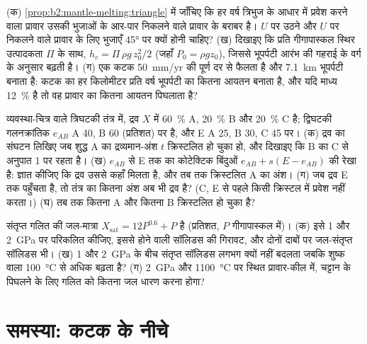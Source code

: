 \begin{exercise}[$\star\star\star$]\label{exo:b2:mantle-melting:10}
(क) \cref{prop:b2:mantle-melting:triangle} में जाँचिए कि हर वर्ष त्रिभुज के आधार में
प्रवेश करने वाला प्रावार उसकी भुजाओं के आर-पार निकलने वाले प्रावार के बराबर है। $U$ पर उठने और $U$ पर निकलने वाले
प्रावार के लिए भुजाएँ \ang{45} पर क्यों होनी चाहिए?
(ख) दिखाइए कि प्रति गीगापास्कल स्थिर उत्पादकता $\Pi$ के साथ, $h_c = \Pi\,\rho
g\,z_0^2/2$ (जहाँ $P_0 = \rho g z_0$), जिससे भूपर्पटी आरंभ की
गहराई के वर्ग के अनुसार बढ़ती है। (ग) एक कटक \qty{50}{mm/yr} की पूर्ण दर से फैलता है और
\qty{7.1}{km} भूपर्पटी बनाता है: कटक का हर किलोमीटर प्रति वर्ष भूपर्पटी का कितना आयतन
बनाता है, और यदि माध्य 
\qty{12}{\percent} है तो वह प्रावार का कितना आयतन पिघलाता है?
\end{exercise}

\begin{exercise}[$\star\star\star$]\label{exo:b2:mantle-melting:11}
व्यवस्था-चित्र वाले त्रिघटकी तंत्र में, द्रव $X$ में
\qty{60}{\percent} A, \qty{20}{\percent} B और \qty{20}{\percent} C है;
द्विघटकी गलनक्रांतिक $e_{AB}$ A 40, B 60 (प्रतिशत) पर है, और  E
A 25, B 30, C 45 पर। (क) द्रव का संघटन लिखिए जब शुद्ध A का द्रव्यमान-अंश $t$
क्रिस्टलित हो चुका हो, और दिखाइए कि B का C से अनुपात 1 पर रहता है। (ख)
$e_{AB}$ से E तक का कोटेक्टिक बिंदुओं $e_{AB} + s(E - e_{AB})$ की रेखा है: ज्ञात कीजिए
कि द्रव उससे कहाँ मिलता है, और तब तक क्रिस्टलित A का अंश। (ग) जब
द्रव E तक पहुँचता है, तो तंत्र का कितना अंश अब भी द्रव है? (C, E से पहले किसी
क्रिस्टल में प्रवेश नहीं करता।) (घ) तब तक कितना A और कितना B क्रिस्टलित हो चुका है?
\end{exercise}

\begin{exercise}[$\star\star\star$]\label{exo:b2:mantle-melting:12}
संतृप्त गलित की जल-मात्रा $X_{\mathrm{sat}} = 12P^{0.6} + P$ है
(प्रतिशत, $P$ गीगापास्कल में)। (क) इसे 1 और \qty{2}{GPa} पर परिकलित कीजिए, इससे होने वाली सॉलिडस की
गिरावट, और दोनों दाबों पर जल-संतृप्त सॉलिडस भी। (ख) 1 और \qty{2}{GPa} के बीच
संतृप्त सॉलिडस लगभग क्यों नहीं बदलता जबकि शुष्क वाला
\qty{100}{\celsius} से अधिक बढ़ता है? (ग) \qty{2}{GPa} और
\qty{1100}{\celsius} पर स्थित प्रावार-कील में, चट्टान के पिघलने के लिए गलित को कितना जल धारण करना होगा?
\end{exercise}

\section{समस्या: कटक के नीचे}

